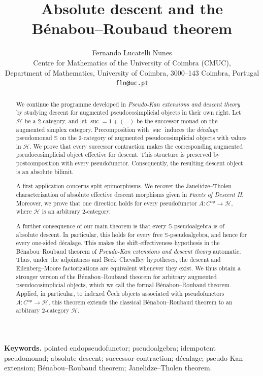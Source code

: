 \documentclass[11pt,a4paper]{article}
\title{Absolute descent and the
B\'enabou--Roubaud theorem}
\author{Fernando Lucatelli Nunes\\[0.4em]
  \small Centre for Mathematics of the University of Coimbra (CMUC),\\[-0.1em]
  \small Department of Mathematics, University of Coimbra, 3000--143 Coimbra, Portugal\\[-0.1em]
  \small\href{mailto:fln@uc.pt}{\texttt{fln@uc.pt}}}
\date{}
\numberwithin{equation}{section}
\theoremstyle{definition}
\theoremstyle{remark}
\newcommand{\op}{\mathrm{op}}
\newcommand{\Hcat}{\mathcal H}
\newcommand{\suc}{\operatorname{suc}}
\newcommand{\Smon}{\mathbb S}
\begin{document}
\maketitle
\begin{abstract}
	We continue the programme developed in \emph{Pseudo-Kan extensions and
		descent theory} by studying descent for augmented pseudocosimplicial
	objects in their own right. Let \(\mathcal H\) be a \(2\)-category,
	and let \(\suc=\mathsf{1}+(-)\) be the successor monad on the augmented
	simplex category. Precomposition with \(\suc\) induces the
	\textit{d\'ecalage} pseudomonad \(\Smon\) on the \(2\)-category of augmented
	pseudocosimplicial objects with values in \(\mathcal H\). We prove
	that every successor contraction makes the corresponding augmented
	pseudocosimplicial object effective for descent. This structure
	is preserved by postcomposition with every pseudofunctor.
	Consequently, the resulting descent object is an absolute bilimit.
	
	A first application concerns split epimorphisms. We recover the
	Janelidze--Tholen characterization of absolute effective descent
	morphisms given in \emph{Facets of Descent II}. Moreover, we prove
	that one direction holds for every pseudofunctor
	\(A\colon C^{\op}\to\Hcat\), where \(\Hcat\) is an arbitrary
	\(2\)-category.
	
	A further consequence of our main theorem is that every
	\(\Smon\)-pseudoalgebra is of absolute descent. In particular,
	this holds for every free \(\Smon\)-pseudoalgebra, and hence for
	every one-sided d\'ecalage. This makes the shift-effectiveness
	hypothesis in the B\'enabou--Roubaud theorem of
	\emph{Pseudo-Kan extensions and descent theory} automatic. Thus, under
	the adjointness and Beck--Chevalley hypotheses, the descent and
	Eilenberg--Moore factorizations are equivalent whenever they exist.
	We thus obtain a stronger version of the B\'enabou--Roubaud theorem for
	arbitrary augmented pseudocosimplicial objects, which we call the
	formal B\'enabou--Roubaud theorem. Applied, in particular, to indexed
	\v{C}ech objects associated with pseudofunctors
	\(A\colon C^{\op}\to\Hcat\), this theorem extends the classical
	B\'enabou--Roubaud theorem to an arbitrary \(2\)-category \(\Hcat\).
\end{abstract}
\medskip
\noindent\textbf{Keywords.}
pointed endopseudofunctor; pseudoalgebra; idempotent pseudomonad;
absolute descent; successor contraction; d\'ecalage; pseudo-Kan
extension; B\'enabou--Roubaud theorem; Janelidze--Tholen theorem.
\end{document}
